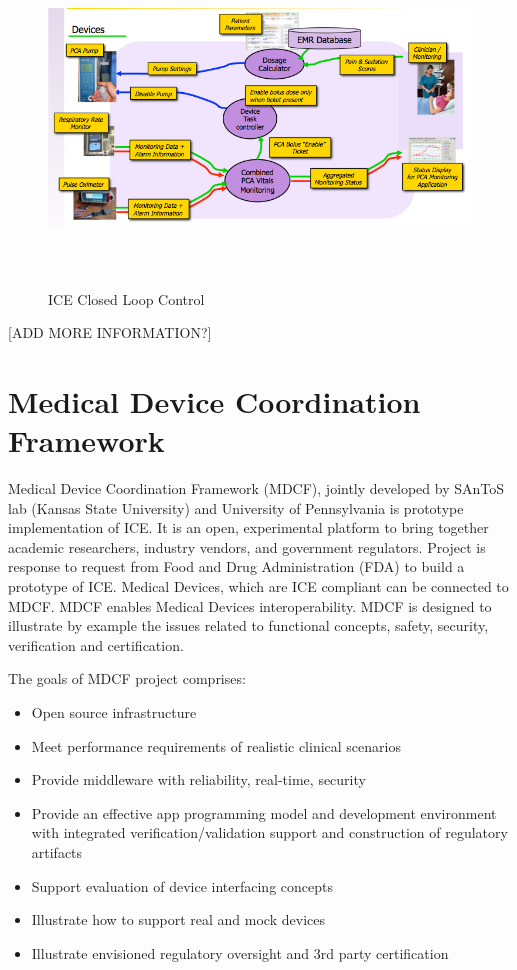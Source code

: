 \begin{figure}[ht]%
    \begin{center}
    	\includegraphics[height=3.5in]{figures/ice.png}   	
    \end{center}
    \caption{ICE Closed Loop Control}
    \label{figure:ice}
\end{figure}

[ADD MORE INFORMATION?]


\section{Medical Device Coordination Framework}
\label{background:mdcf}

Medical Device Coordination Framework (MDCF), jointly developed by SAnToS lab (Kansas State University) and University of Pennsylvania is prototype implementation of ICE. It is an open, experimental platform to bring together academic researchers, industry vendors, and government regulators. Project is response to request from Food and Drug Administration (FDA) to build a prototype of ICE. Medical Devices, which are ICE compliant can be connected to MDCF. MDCF enables Medical Devices interoperability. MDCF is designed to illustrate by example the issues related to functional concepts, safety, security, verification and certification. 

The goals of MDCF project comprises:
\begin{itemize}
	\item Open source infrastructure
	\item Meet performance requirements of realistic clinical scenarios
	\item Provide middleware with reliability, real-time, security
	\item Provide an effective app programming model and development environment with integrated verification/validation support and construction of regulatory artifacts
	\item Support evaluation of device interfacing concepts
	\item Illustrate how to support real and mock devices
	\item Illustrate envisioned regulatory oversight and 3rd party certification
\end{itemize}

